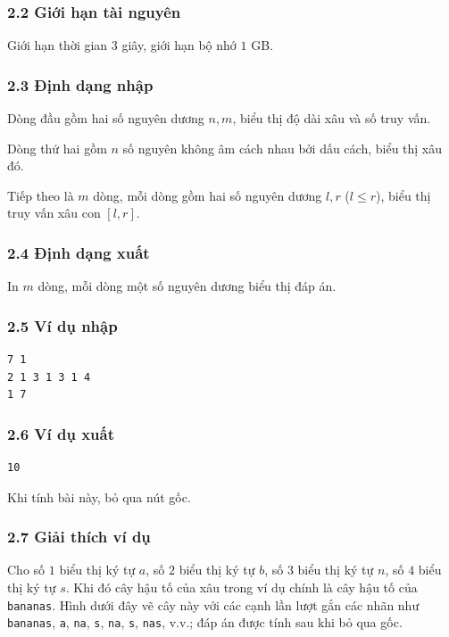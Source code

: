 \documentclass[11pt]{article}
\begin{document}
\subsubsection*{2.2 Giới hạn tài nguyên}

Giới hạn thời gian \(3\) giây, giới hạn bộ nhớ \(1\) GB.

\subsubsection*{2.3 Định dạng nhập}

Dòng đầu gồm hai số nguyên dương \(n,m\), biểu thị độ dài xâu và số truy vấn.

Dòng thứ hai gồm \(n\) số nguyên không âm cách nhau bởi dấu cách, biểu thị xâu
đó.

Tiếp theo là \(m\) dòng, mỗi dòng gồm hai số nguyên dương \(l,r\) (\(l\le r\)),
biểu thị truy vấn xâu con \([l,r]\).

\subsubsection*{2.4 Định dạng xuất}

In \(m\) dòng, mỗi dòng một số nguyên dương biểu thị đáp án.

\subsubsection*{2.5 Ví dụ nhập}

\begin{verbatim}
7 1
2 1 3 1 3 1 4
1 7
\end{verbatim}

\subsubsection*{2.6 Ví dụ xuất}

\begin{verbatim}
10
\end{verbatim}

\noindent Khi tính bài này, bỏ qua nút gốc.

\subsubsection*{2.7 Giải thích ví dụ}

Cho số \(1\) biểu thị ký tự \(a\), số \(2\) biểu thị ký tự \(b\), số \(3\) biểu
thị ký tự \(n\), số \(4\) biểu thị ký tự \(s\). Khi đó cây hậu tố của xâu trong
ví dụ chính là cây hậu tố của \texttt{bananas}. Hình dưới đây vẽ cây này với
các cạnh lần lượt gắn các nhãn như \texttt{bananas}, \texttt{a}, \texttt{na},
\texttt{s}, \texttt{na}, \texttt{s}, \texttt{nas}, v.v.; đáp án được tính sau
khi bỏ qua gốc.
\end{document}
